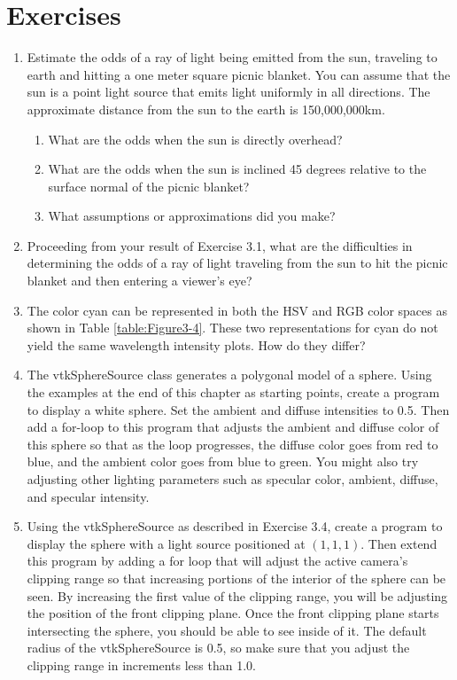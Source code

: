 \section{Exercises}
\begin{enumerate}

\item Estimate the odds of a ray of light being emitted from the sun, traveling to earth and hitting a one meter square picnic blanket. You can assume that the sun is a point light source that emits light uniformly in all directions. 
The approximate distance from the sun to the earth is 150,000,000km.

\begin{enumerate}

    \item What are the odds when the sun is directly overhead?

    \item What are the odds when the sun is inclined 45 degrees relative to the surface normal of the picnic blanket?

    \item What assumptions or approximations did you make?

\end{enumerate}

\item Proceeding from your result of Exercise 3.1, what are the difficulties in determining the odds of a ray of light traveling from the sun to hit the picnic blanket and then entering a viewer's eye?

\item The color cyan can be represented in both the HSV and RGB color spaces as shown in Table \ref{table:Figure3-4}. These two representations for cyan do not yield the same wavelength intensity plots. How do they differ?

\item The vtkSphereSource class generates a polygonal model of a sphere.
Using the examples at the end of this chapter as starting points, create a program to display a white sphere.
Set the ambient and diffuse intensities to 0.5. Then add a for-loop to this program that adjusts the ambient and diffuse color of this sphere so that as the loop progresses, the diffuse color goes from red to blue, and the ambient color goes from blue to green.
You might also try adjusting other lighting parameters such as specular color, ambient, diffuse, and specular intensity.

\item Using the vtkSphereSource as described in Exercise 3.4, create a program to display the sphere with a light source positioned at $(1,1,1)$. Then extend this program by adding a for loop that will adjust the active camera’s clipping range so that increasing portions of the interior of the sphere can be seen.
By increasing the first value of the clipping range, you will be adjusting the position of the front clipping plane.
Once the front clipping plane starts intersecting the sphere, you should be able to see inside of it.
The default radius of the vtkSphereSource is 0.5, so make sure that you adjust the clipping range in increments less than 1.0.


\end{enumerate}
